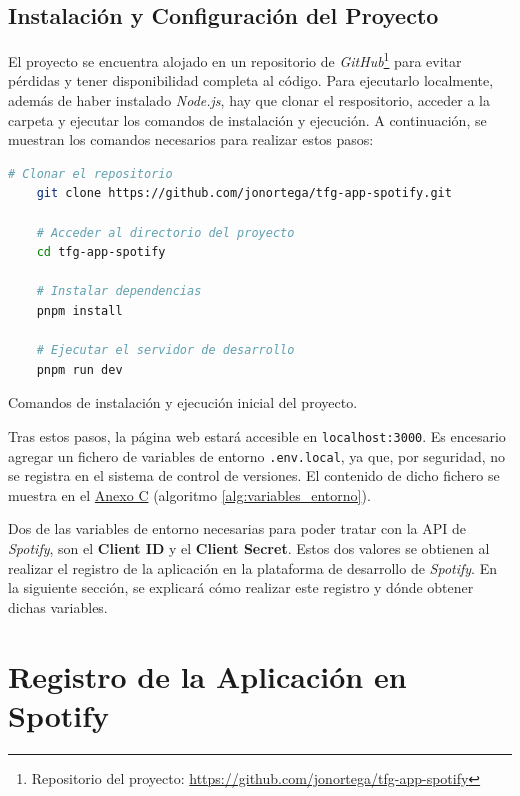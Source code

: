 \subsection{Instalación y Configuración del Proyecto}

El proyecto se encuentra alojado en un repositorio de \textit{GitHub}\footnote{Repositorio del proyecto: \href{https://github.com/jonortega/tfg-app-spotify}{https://github.com/jonortega/tfg-app-spotify}} para evitar pérdidas y tener disponibilidad completa al código. Para ejecutarlo localmente, además de haber instalado \textit{Node.js}, hay que clonar el respositorio, acceder a la carpeta y ejecutar los comandos de instalación y ejecución. A continuación, se muestran los comandos necesarios para realizar estos pasos:

\begin{ifalgorithm}[H]
    \begin{lstlisting}[language=bash]
    # Clonar el repositorio
    git clone https://github.com/jonortega/tfg-app-spotify.git
    
    # Acceder al directorio del proyecto
    cd tfg-app-spotify
    
    # Instalar dependencias
    pnpm install
    
    # Ejecutar el servidor de desarrollo
    pnpm run dev
    \end{lstlisting}
    \caption{Comandos de instalación y ejecución inicial del proyecto.}
    \label{alg:instalacion_proyecto}
\end{ifalgorithm}

Tras estos pasos, la página web estará accesible en \texttt{localhost:3000}. Es encesario agregar un fichero de variables de entorno \texttt{.env.local}, ya que, por seguridad, no se registra en el sistema de control de versiones. El contenido de dicho fichero se muestra en el \hyperref[ch:anexoC]{Anexo C} (algoritmo \ref{alg:variables_entorno}).

Dos de las variables de entorno necesarias para poder tratar con la API de \textit{Spotify}, son el \textbf{Client ID} y el \textbf{Client Secret}. Estos dos valores se obtienen al realizar el registro de la aplicación en la plataforma de desarrollo de \textit{Spotify}. En la siguiente sección, se explicará cómo realizar este registro y dónde obtener dichas variables.

\newpage

\section{Registro de la Aplicación en Spotify}

